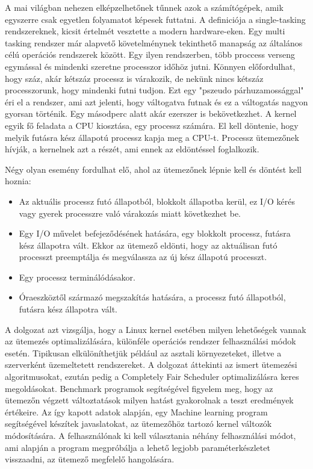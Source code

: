 
A mai világban nehezen elképzelhetőnek tűnnek azok a számítógépek, amik egyszerre csak egyetlen folyamatot képesek futtatni.
A definiciója a single-tasking rendszereknek, kicsit értelmét vesztette a modern hardware-eken. Egy multi tasking rendszer már alapvető követelménynek tekinthető manapság az általános célú operációs rendszerek között. Egy ilyen rendszerben, több proccess verseng egymással és mindenki szeretne processzor időhöz jutni. Könnyen előfordulhat, hogy száz, akár kétszáz processz is várakozik, de nekünk nincs kétszáz processzorunk, hogy mindenki futni tudjon. Ezt egy "pszeudo párhuzamossággal" éri el a rendszer, ami azt jelenti, hogy váltogatva futnak és ez a váltogatás nagyon gyorsan történik. Egy másodperc alatt akár ezerszer is bekövetkezhet.
A kernel egyik fő feladata a CPU kiosztása, egy processz számára. El kell döntenie, hogy melyik futásra kész állapotú processz kapja meg a CPU-t.
Processz ütemezőnek hívják, a kernelnek azt a részét, ami ennek az eldöntéssel foglalkozik.

Négy olyan esemény fordulhat elő, ahol az ütemezőnek lépnie kell és döntést kell hoznia:
\begin{itemize}
  \item Az aktuális processz futó állapotból, blokkolt állapotba kerül, ez I/O kérés vagy gyerek processzre való várakozás miatt következhet be.
  \item Egy I/O művelet befejeződésének hatására, egy blokkolt processz, futásra kész állapotra vált. Ekkor az ütemező eldönti, hogy az aktuálisan futó processzt preemptálja és megválassza az új kész állapotú processzt.
  \item Egy processz terminálódásakor.
  \item Óraeszköztől származó megszakítás hatására, a processz futó állapotból, futásra kész állapotra vált. 
\end{itemize}

A dolgozat azt vizsgálja, hogy a Linux kernel esetében milyen lehetőségek vannak az ütemezés optimalizálására, különféle operációs rendszer felhasználási módok esetén. Tipikusan elkülöníthetjük például az asztali környezeteket, illetve a szerverként üzemeltetett rendszereket. A dolgozat áttekinti az ismert ütemezési algoritmusokat, ezután pedig a Completely Fair Scheduler optimalizálásra keres megoldásokat. Benchmark programok segítségével figyelem meg, hogy az ütemezőn végzett változtatások milyen hatást gyakorolnak a teszt eredmények értékeire.
Az így kapott adatok alapján, egy Machine learning program segítségével készítek javaslatokat, az ütemezőhöz tartozó kernel változók módosítására. A felhasználónak ki kell választania néhány felhasználási módot, ami alapján a program megpróbálja a lehető legjobb paraméterkészletet visszaadni, az ütemező megfelelő hangolására.